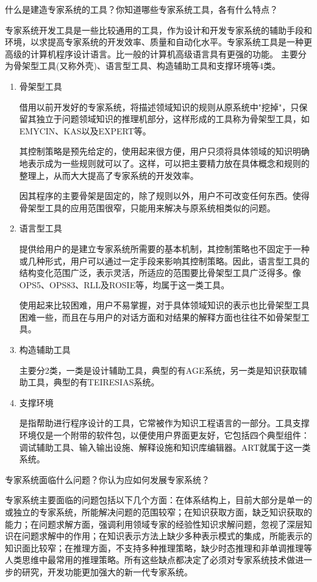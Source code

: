 \begin{question}
什么是建造专家系统的工具？你知道哪些专家系统工具，各有什么特点？
\end{question}
\begin{solution}
专家系统开发工具是一些比较通用的工具，作为设计和开发专家系统的辅助手段和环境，以求提高专家系统的开发效率、质量和自动化水平。专家系统工具是一种更高级的计算机程序设计语言。比一般的计算机高级语言具有更强的功能。 
主要分为骨架型工具(又称外壳)、语言型工具、构造辅助工具和支撑环境等4类。
	\begin{enumerate}
		\item 骨架型工具 \par
		借用以前开发好的专家系统，将描述领域知识的规则从原系统中"挖掉"，只保留其独立于问题领域知识的推理机部分，这样形成的工具称为骨架型工具，如EMYCIN、KAS以及EXPERT等。\par
		其控制策略是预先给定的，使用起来很方便，用户只须将具体领域的知识明确地表示成为一些规则就可以了。这样，可以把主要精力放在具体概念和规则的整理上，从而大大提高了专家系统的开发效率。\par
		因其程序的主要骨架是固定的，除了规则以外，用户不可改变任何东西。使得骨架型工具的应用范围很窄，只能用来解决与原系统相类似的问题。
		\item 语言型工具 \par
		提供给用户的是建立专家系统所需要的基本机制，其控制策略也不固定于一种或几种形式，用户可以通过一定手段来影响其控制策略。因此，语言型工具的结构变化范围广泛，表示灵活，所适应的范围要比骨架型工具广泛得多。像OPS5、OPS83、RLL及ROSIE等，均属于这一类工具。\par
		使用起来比较困难，用户不易掌握，对于具体领域知识的表示也比骨架型工具困难一些，而且在与用户的对话方面和对结果的解释方面也往往不如骨架型工具。 
		\item 构造辅助工具 \par
		主要分2类，一类是设计辅助工具，典型的有AGE系统，另一类是知识获取辅助工具，典型的有TEIRESIAS系统。
 		\item 支撑环境 \par
		是指帮助进行程序设计的工具，它常被作为知识工程语言的一部分。工具支撑环境仅是一个附带的软件包，以便使用户界面更友好，它包括四个典型组件：调试辅助工具、输入输出设施、解释设施和知识库编辑器。ART就属于这一类系统。
	\end{enumerate}
\end{solution}

\begin{question}
专家系统面临什么问题？你认为应如何发展专家系统？
\end{question}
\begin{solution}
专家系统主要面临的问题包括以下几个方面：在体系结构上，目前大部分是单一的或独立的专家系统，所能解决问题的范围较窄；在知识获取方面，缺乏知识获取的能力；在问题求解方面，强调利用领域专家的经验性知识求解问题，忽视了深层知识在问题求解中的作用；在知识表示方法上缺少多种表示模式的集成，所能表示的知识面比较窄；在推理方面，不支持多种推理策略，缺少时态推理和非单调推理等人类思维中最常用的推理策略。所有这些缺点都决定了必须对专家系统技术做进一步的研究，开发功能更加强大的新一代专家系统。
\end{solution}

